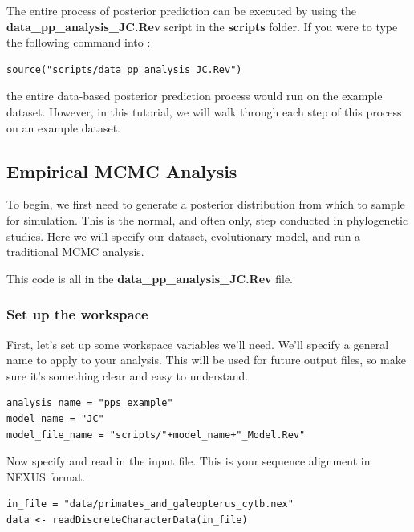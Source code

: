 The entire process of posterior prediction can be executed by using the \textbf{data\_pp\_analysis\_JC.Rev} script in the \textbf{scripts}
folder. If you were to type the following command into \RevBayes:

{\tt \begin{Snugshade}[184,207,236]
\begin{lstlisting}
source("scripts/data_pp_analysis_JC.Rev")
\end{lstlisting}
\end{Snugshade}}

the entire data-based posterior prediction process would run on the example dataset. However, in this tutorial, we 
will walk through each step of this process on an example dataset. 

\subsection{Empirical MCMC Analysis}

To begin, we first need to generate a posterior distribution from which to sample for simulation. 
This is the normal, and often only, step conducted in phylogenetic studies. Here we will specify our 
dataset, evolutionary model, and run a traditional MCMC analysis. 

This code is all in the \textbf{data\_pp\_analysis\_JC.Rev} file.

\subsubsection{Set up the workspace}

First, let's set up some workspace variables we'll need.
We'll specify a general name to apply to your analysis. This will be used for future output files, so make sure it's something clear and easy to understand.
{\tt \begin{Snugshade}[184,207,236]
\begin{lstlisting}
analysis_name = "pps_example"
model_name = "JC"
model_file_name = "scripts/"+model_name+"_Model.Rev"
\end{lstlisting}
\end{Snugshade}}

Now specify and read in the input file. This is your sequence alignment in NEXUS format.
{\tt \begin{Snugshade}[184,207,236]
\begin{lstlisting}
in_file = "data/primates_and_galeopterus_cytb.nex"
data <- readDiscreteCharacterData(in_file)
\end{lstlisting}
\end{Snugshade}}

